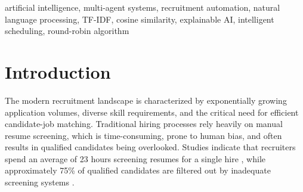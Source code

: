 \documentclass[conference]{IEEEtran}
\begin{document}
\begin{abstract}
The recruitment industry faces significant challenges in efficiently matching candidates with job opportunities due to manual screening processes, high application volumes, and subjective evaluation criteria. This paper presents an AI-Powered Agentic Hiring Platform that leverages multi-agent systems, natural language processing, and intelligent scheduling algorithms to automate and optimize the recruitment workflow. The proposed system integrates multiple specialized AI agents including a Parser Agent for resume extraction, a Matcher Agent implementing TF-IDF vectorization, a Shortlist Agent using Cosine Similarity for semantic matching, a Scheduler Agent with break-aware round-robin algorithm, an Aggregator Agent for multi-source job consolidation, and an Optimizer Agent powered by Groq Llama 3.3 70B for resume enhancement. The platform demonstrates explainable AI-driven shortlisting with human-readable match explanations, near-perfect interviewer load distribution ($\Delta_{load} \leq 1$), and linear-time scheduling complexity O($|C|$). Implemented using Node.js, React, and PostgreSQL, the system provides a production-ready solution with role-based access control, external API integration (Adzuna, Jooble), and comprehensive database architecture supporting complex recruitment workflows.
\end{abstract}

\begin{IEEEkeywords}
artificial intelligence, multi-agent systems, recruitment automation, natural language processing, TF-IDF, cosine similarity, explainable AI, intelligent scheduling, round-robin algorithm
\end{IEEEkeywords}

\section{Introduction}

The modern recruitment landscape is characterized by exponentially growing application volumes, diverse skill requirements, and the critical need for efficient candidate-job matching. Traditional hiring processes rely heavily on manual resume screening, which is time-consuming, prone to human bias, and often results in qualified candidates being overlooked. Studies indicate that recruiters spend an average of 23 hours screening resumes for a single hire \cite{recruitment_time}, while approximately 75\% of qualified candidates are filtered out by inadequate screening systems \cite{ats_limitations}.
\end{document}
